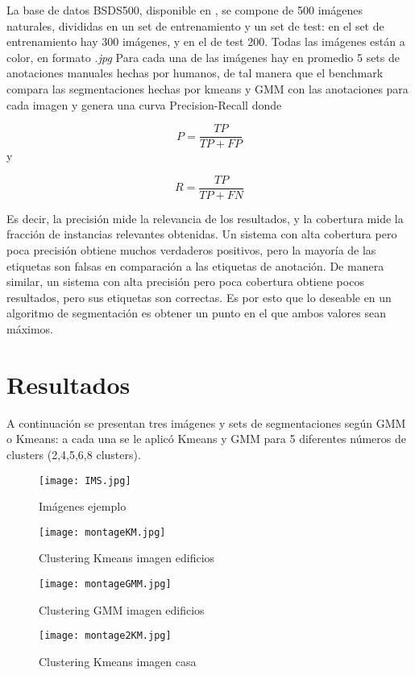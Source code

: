 \documentclass[10pt,twocolumn,letterpaper]{article}
\begin{document}
La base de datos BSDS500, disponible en \cite{8_berkeley.edu}, se compone de 500 imágenes naturales, divididas en un set de entrenamiento y un set de test: en el set de entrenamiento hay 300 imágenes, y en el de test 200. Todas las imágenes están a color, en formato \textit{.jpg} Para cada una de las imágenes hay en promedio 5 sets de anotaciones manuales hechas por humanos, de tal manera que el benchmark compara las segmentaciones hechas por kmeans y GMM con las anotaciones para cada imagen y genera una curva Precision-Recall donde

$$
P=\frac{TP}{TP+FP}
$$
y

$$
R=\frac{TP}{TP+FN}
$$

Es decir, la precisión mide la relevancia de los resultados, y la cobertura mide la fracción de instancias relevantes obtenidas. Un sistema con alta cobertura pero poca precisión obtiene muchos verdaderos positivos, pero la mayoría de las etiquetas son falsas en comparación a las etiquetas de anotación. De manera similar, un sistema con alta precisión pero poca cobertura obtiene pocos resultados, pero sus etiquetas son correctas. Es por esto que lo deseable en un algoritmo de segmentación es obtener un punto en el que ambos valores sean máximos.

\section{Resultados}
A continuación se presentan tres imágenes y sets de segmentaciones según GMM o Kmeans: a cada una se le aplicó Kmeans y GMM para 5 diferentes números de clusters (2,4,5,6,8 clusters).

\begin{figure}[H]
\centering
\texttt{[image: IMS.jpg]}
\caption{Imágenes ejemplo}
\end{figure}

\begin{figure}[H]
\centering
\texttt{[image: montageKM.jpg]}
\caption{Clustering Kmeans imagen edificios}
\end{figure}

\begin{figure}[H]
\centering
\texttt{[image: montageGMM.jpg]}
\caption{Clustering GMM imagen edificios}
\end{figure}

\begin{figure}[H]
\centering
\texttt{[image: montage2KM.jpg]}
\caption{Clustering Kmeans imagen casa}
\end{figure}
\end{document}
